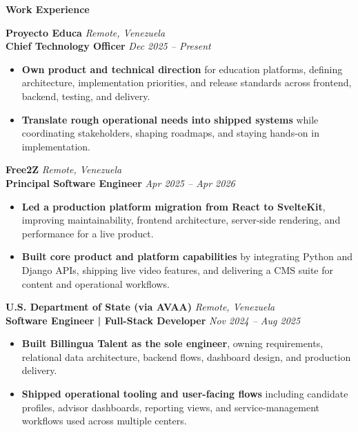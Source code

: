 \documentclass[11pt]{article}
\begin{document}
\vspace{6pt}
\begin{center}
    \textbf{Work Experience}
\end{center}
\vspace{-4pt}

\textbf{Proyecto Educa} \hfill \textit{Remote, Venezuela} \\
\textbf{Chief Technology Officer} \hfill \textit{Dec 2025 -- Present}
\begin{itemize}
    \item \textbf{Own product and technical direction} for education platforms, defining architecture, implementation priorities, and release standards across frontend, backend, testing, and delivery.
    \item \textbf{Translate rough operational needs into shipped systems} while coordinating stakeholders, shaping roadmaps, and staying hands-on in implementation.
\end{itemize}

\vspace{8pt}
\textbf{Free2Z} \hfill \textit{Remote, Venezuela} \\
\textbf{Principal Software Engineer} \hfill \textit{Apr 2025 -- Apr 2026}
\begin{itemize}
    \item \textbf{Led a production platform migration from React to SvelteKit}, improving maintainability, frontend architecture, server-side rendering, and performance for a live product.
    \item \textbf{Built core product and platform capabilities} by integrating Python and Django APIs, shipping live video features, and delivering a CMS suite for content and operational workflows.
\end{itemize}

\vspace{8pt}
\textbf{U.S. Department of State (via AVAA)} \hfill \textit{Remote, Venezuela} \\
\textbf{Software Engineer | Full-Stack Developer} \hfill \textit{Nov 2024 -- Aug 2025}
\begin{itemize}
    \item \textbf{Built Billingua Talent as the sole engineer}, owning requirements, relational data architecture, backend flows, dashboard design, and production delivery.
    \item \textbf{Shipped operational tooling and user-facing flows} including candidate profiles, advisor dashboards, reporting views, and service-management workflows used across multiple centers.
\end{itemize}
\end{document}
